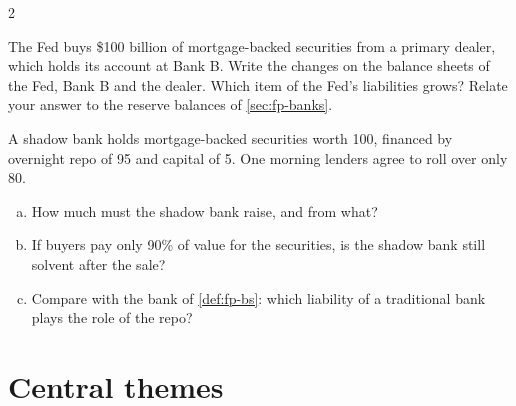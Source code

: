 \begin{paracol}{2}
\begin{exercise}
The Fed buys \$100 billion of mortgage-backed securities from a primary dealer, which holds its account at Bank B.
Write the changes on the balance sheets of the Fed, Bank B and the dealer. Which item of the Fed's liabilities
grows? Relate your answer to the reserve balances of \cref{sec:fp-banks}.
\end{exercise}

\begin{exercise}
A shadow bank holds mortgage-backed securities worth 100, financed by overnight repo of 95 and capital of 5. One
morning lenders agree to roll over only 80.
\begin{enumerate}[(a)]
  \item How much must the shadow bank raise, and from what?
  \item If buyers pay only 90\% of value for the securities, is the shadow bank still solvent after the sale?
  \item Compare with the bank of \cref{def:fp-bs}: which liability of a traditional bank plays the role of the repo?
\end{enumerate}
\end{exercise}

\section{Central themes}\label{sec:fp-themes}


\end{paracol}
